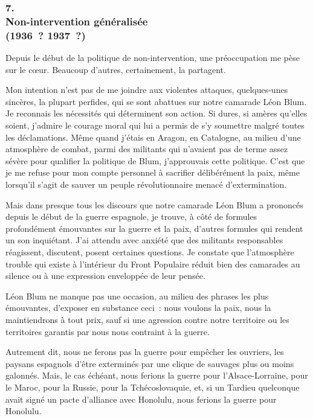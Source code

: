 \documentclass[french,twoside]{book} %
\begin{document}
\subsubsection[7. Non-intervention généralisée, (1936 ? 1937 ?)]{7. \\
Non-intervention généralisée \\
(1936 ? 1937 ?)}
\noindent \par
Depuis le début de la politique de non-intervention, une préoccupation me pèse sur le cœur. Beaucoup d'autres, certainement, la partagent.\par
Mon intention n'est pas de me joindre aux violentes attaques, quelques-unes sincères, la plupart perfides, qui se sont abattues sur notre camarade Léon Blum. Je reconnais les nécessités qui déterminent son action. Si dures, si amères qu'elles soient, j'admire le courage moral qui lui a permis de s'y soumettre malgré toutes les déclamations. Même quand j'étais en Aragon, en Catalogne, au milieu d'une atmosphère de combat, parmi des militants qui n'avaient pas de terme assez sévère pour qualifier la politique de Blum, j'approuvais cette politique. C'est que je me refuse pour mon compte person­nel à sacrifier délibérément la paix, même lorsqu'il s'agit de sauver un peuple révolutionnaire menacé d'extermination.\par
Mais dans presque tous les discours que notre camarade Léon Blum a prononcés depuis le début de la guerre espagnole, je trouve, à côté de formu­les profondément émouvantes sur la guerre et la paix, d'autres formules qui rendent un son inquiétant. J'ai attendu avec anxiété que des militants respon­sables réagissent, discutent, posent certaines questions. Je constate que l'atmosphère trouble qui existe à l'intérieur du Front Populaire réduit bien des camarades au silence ou à une expression enveloppée de leur pensée.\par
Léon Blum ne manque pas une occasion, au milieu des phrases les plus émouvantes, d'exposer en substance ceci : nous voulons la paix, nous la maintiendrons à tout prix, sauf si une agression contre notre territoire ou les territoires garantis par nous nous contraint à la guerre.\par
Autrement dit, nous ne ferons pas la guerre pour empêcher les ouvriers, les paysans espagnols d'être exterminés par une clique de sauvages plus ou moins galonnés. Mais, le cas échéant, nous ferions la guerre pour l'Alsace-Lorraine, pour le Maroc, pour la Russie, pour la Tchécoslovaquie, et, si un Tardieu quelconque avait signé un pacte d'alliance avec Honolulu, nous ferions la guerre pour Honolulu.\par
\end{document}
